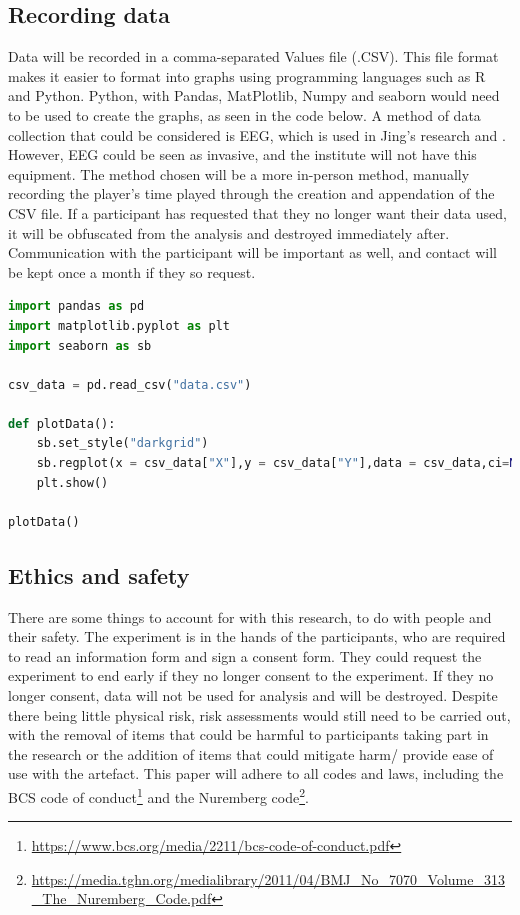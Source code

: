 \documentclass[conference]{IEEEtran}
\begin{document}
\subsection{Recording data}
Data will be recorded in a comma-separated Values file (.CSV). This file format makes it easier to format into graphs using programming languages such as R and Python. Python, with Pandas, MatPlotlib, Numpy and seaborn would need to be used to create the graphs, as seen in the code below. A method of data collection that could be considered is EEG, which is used in Jing's research \cite{Jing2024} and \cite{Ruqeyya2022}. However, EEG could be seen as invasive, and the institute will not have this equipment. The method chosen will be a more in-person method, manually recording the player's time played through the creation and appendation of the CSV file. If a participant has requested that they no longer want their data used, it will be obfuscated from the analysis and destroyed immediately after. Communication with the participant will be important as well, and contact will be kept once a month if they so request.\\


%

\begin{lstlisting}[language=Python, caption=Python Script for generating Graphs,captionpos=b]
import pandas as pd
import matplotlib.pyplot as plt
import seaborn as sb

csv_data = pd.read_csv("data.csv")

def plotData():
    sb.set_style("darkgrid")
    sb.regplot(x = csv_data["X"],y = csv_data["Y"],data = csv_data,ci=None)
    plt.show()

plotData()
\end{lstlisting}

\subsection{Ethics and safety}
There are some things to account for with this research, to do with people and their safety. The experiment is in the hands of the participants, who are required to read an information form and sign a consent form. They could request the experiment to end early if they no longer consent to the experiment.  If they no longer consent, data will not be used for analysis and will be destroyed. Despite there being little physical risk, risk assessments would still need to be carried out, with the removal of items that could be harmful to participants taking part in the research or the addition of items that could mitigate harm/ provide ease of use with the artefact. This paper will adhere to all codes and laws, including the BCS code of conduct\footnote{\url{https://www.bcs.org/media/2211/bcs-code-of-conduct.pdf}} and the Nuremberg code\footnote{\url{https://media.tghn.org/medialibrary/2011/04/BMJ_No_7070_Volume_313_The_Nuremberg_Code.pdf}}.\\
\end{document}
